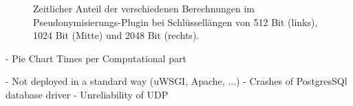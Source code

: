 \begin{figure}[]
    \centering
    \caption{Zeitlicher Anteil der verschiedenen Berechnungen im Pseudonymisierungs-Plugin bei  Schlüssellängen von 512 Bit (links), 1024 Bit (Mitte) und 2048 Bit (rechts).}
    \label{fig:eval_piecharts}
\end{figure}



- Pie Chart Times per Computational part

- Not  deployed in a standard way (uWSGI, Apache, ...)
- Crashes of PostgresSQl database driver
- Unreliability of UDP